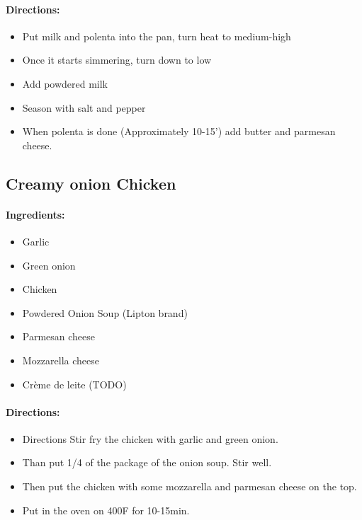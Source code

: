 \documentclass{article}
\begin{document}
\paragraph{Directions:}
\begin{itemize}
	\item Put milk and polenta into the pan, turn heat to medium-high
	\item Once it starts simmering, turn down to low
	\item Add powdered milk
	\item Season with salt and pepper
	\item When polenta is done (Approximately 10-15') add butter and parmesan cheese.
\end{itemize}

\subsection{Creamy onion Chicken}

\paragraph{Ingredients:}

\begin{itemize}
	\item Garlic 
	\item Green onion 
	\item Chicken 
	\item Powdered Onion Soup (Lipton brand) 
	\item Parmesan cheese 
	\item Mozzarella cheese 
	\item Crème de leite (TODO)
\end{itemize}

\paragraph{Directions:}
\begin{itemize}
	\item Directions Stir fry the chicken with garlic and green onion. 
	\item Than put 1/4 of the package of the onion soup. Stir well.
	\item Then put the chicken with some mozzarella and parmesan cheese on the top. 
	\item Put in the oven on 400F for 10-15min.
\end{itemize}
\end{document}
